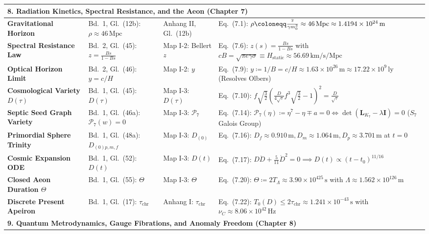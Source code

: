 \documentclass[
    12pt,
    a4paper,
    headings=normal,
    twoside=false,
    open=any,
    parskip=half
]{scrbook}
\let\hbar\relax
\begin{document}
\begin{longtable}{p{3.4cm}p{3.2cm}p{3.2cm}p{5.4cm}}
\multicolumn{4}{l}{\textsf{\textbf{\color{maincolor!90!black}8. Radiation Kinetics, Spectral Resistance, and the Aeon (Chapter 7)}}} \\\midrule
\textbf{Gravitational Horizon} & Bd.~1, Gl.~(12b): $\rho \approx 46\,\text{Mpc}$ & Anhang II, Gl.~(12b) & Eq.~(7.1): $\rho \coloneqq \frac{\hbar^2}{\gamma m_0^3} \approx 46\,\text{Mpc} \approx 1.4194 \times 10^{24}\,\text{m}$ \\
\textbf{Spectral Resistance Law} & Bd.~2, Gl.~(45): $z = \frac{Bs}{1-Bs}$ & Map I-2: Bellert $z$ & Eq.~(7.6): $z(s) = \frac{Bs}{1-Bs}$ with $cB = \sqrt{\pi e\gamma\sigma} \equiv H_{\text{static}} \approx 56.69\,\text{km/s/Mpc}$ \\
\textbf{Optical Horizon Limit} & Bd.~2, Gl.~(46): $y = c/H$ & Map I-2: $y$ & Eq.~(7.9): $y \coloneqq 1/B = c/H \approx 1.63 \times 10^{26}\,\text{m} \approx 17.22 \times 10^9\,\text{ly}$ (Resolves Olbers) \\
\textbf{Cosmological Variety $D(\tau)$} & Bd.~1, Gl.~(45): $D(\tau)$ & Map I-3: $D(\tau)$ & Eq.~(7.10): $f\sqrt{\frac{3}{2}}(\frac{D}{4\sqrt{\tau}}f^3\sqrt{\frac{3}{2}} - 1)^2 = \frac{D}{\sqrt{\tau}}$ \\
\textbf{Septic Seed Graph Variety} & Bd.~1, Gl.~(46a): $\mathcal{P}_7(w) = 0$ & Map I-3: $\mathcal{P}_7$ & Eq.~(7.14): $\mathcal{P}_7(\eta) \coloneqq \eta^7 - \eta \mp a = 0 \iff \det(\mathbf{L}_{K_7} - \lambda\mathbf{I}) = 0$ ($S_7$ Galois Group) \\
\textbf{Primordial Sphere Trinity} & Bd.~1, Gl.~(48a): $D_{(0)p,m,f}$ & Map I-3: $D_{(0)}$ & Eq.~(7.16): $D_f \approx 0.910\,\text{m}, D_m \approx 1.064\,\text{m}, D_p \approx 3.701\,\text{m}$ at $t=0$ \\
\textbf{Cosmic Expansion ODE} & Bd.~1, Gl.~(52): $D(t)$ & Map I-3: $D(t)$ & Eq.~(7.17): $D\ddot{D} + \frac{5}{11}\dot{D}^2 = 0 \implies D(t) \propto (t - t_0)^{11/16}$ \\
\textbf{Closed Aeon Duration $\Theta$} & Bd.~1, Gl.~(55): $\Theta$ & Map I-3: $\Theta$ & Eq.~(7.20): $\Theta \coloneqq 2T_\Lambda \approx 3.90 \times 10^{425}\,\text{s}$ with $\Lambda \approx 1.562 \times 10^{126}\,\text{m}$ \\
\textbf{Discrete Present Apeiron} & Bd.~1, Gl.~(17): $\tau_{\text{chr}}$ & Anhang I: $\tau_{\text{chr}}$ & Eq.~(7.22): $T_0(D) \le 2\tau_{\text{chr}} \approx 1.241 \times 10^{-43}\,\text{s}$ with $\nu_C \approx 8.06 \times 10^{42}\,\text{Hz}$ \\\midrule
\multicolumn{4}{l}{\textsf{\textbf{\color{maincolor!90!black}9. Quantum Metrodynamics, Gauge Fibrations, and Anomaly Freedom (Chapter 8)}}} \\\midrule

\end{longtable}
\end{document}
